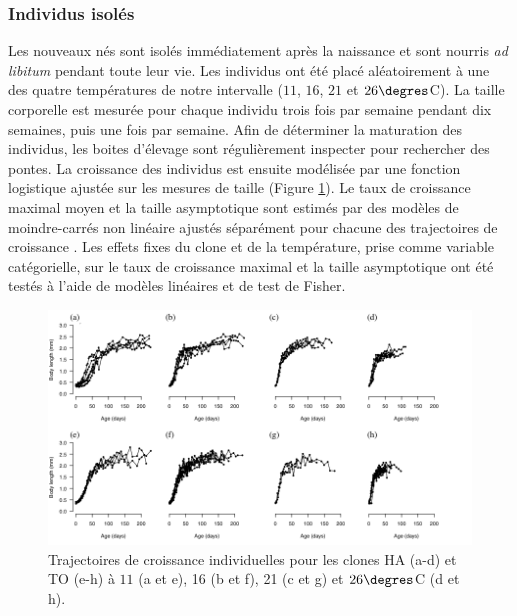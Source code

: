 \subsubsection{Individus isolés}

Les nouveaux nés sont isolés immédiatement après la naissance et sont nourris
\textit{ad libitum} pendant toute leur vie. Les individus ont été placé
aléatoirement à une des quatre températures de notre intervalle ($11$, $16$, $21$ et
$26\degres$C). La taille corporelle est mesurée pour chaque individu trois fois
par semaine pendant dix semaines, puis une fois par semaine. Afin de déterminer
la maturation des individus, les boites d'élevage sont régulièrement inspecter
pour rechercher des pontes. La croissance des individus est ensuite modélisée
par une fonction logistique ajustée sur les mesures de taille (Figure
\ref{fig:FIP1}).
Le taux de croissance maximal moyen et la taille asymptotique sont estimés par des modèles
de moindre-carrés non linéaire ajustés séparément pour chacune des trajectoires
de croissance \autocites{pinheiro2000a}. Les effets fixes du clone et de la
température, prise comme variable catégorielle, sur le taux de croissance
maximal et la taille asymptotique ont été testés à l'aide de modèles linéaires
et de test de Fisher.

\begin{figure}[!ht]
\begin{center}
\includegraphics[width=\textwidth]{1_CorpsDeThese/Resumes/Fig/FIP01}
\caption[Trajectoires de croissance
individuelles]{Trajectoires de croissance individuelles pour les clones HA
(a-d) et TO (e-h) à $11$ (a et e), 16 (b et f), 21 (c et g) et
$26\degres$C (d et h).}
\label{fig:FIP1}
\end{center}
\end{figure}

